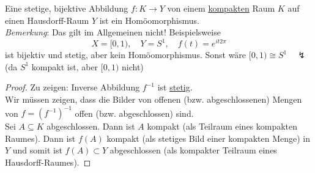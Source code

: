 \begin{theorem}
  Eine stetige, bijektive Abbildung $ f : K \to Y $ von einem \hyperref[def:kompakt]{kompakten} Raum $ K $ auf einen Hausdorff-Raum $ Y $ ist ein Homöomorphismus. \\
  \emph{Bemerkung}: Das gilt im Allgemeinen nicht! Beispielsweise
  \begin{equation*}
    X = [0,1), \quad Y = S^1, \quad f(t) = e^{it2\pi}
  \end{equation*}
  ist bijektiv und stetig, aber kein Homöomorphismus. Sonst wäre $ [0,1) \cong S^1 \quad \lightning $ (da $ S^1 $ kompakt ist, aber $ [0,1) $ nicht)
  \begin{proof}
    Zu zeigen: Inverse Abbildung $ f^{-1} $ ist \hyperref[def:stetig]{stetig}. \\
    Wir müssen zeigen, dass die Bilder von offenen (bzw. abgeschlossenen) Mengen von $ f = \left( f^{-1} \right)^{-1} $ offen (bzw. abgeschlossen) sind. \\
    Sei $ A \subseteq K $ abgeschlossen. Dann ist $ A $ kompakt (als Teilraum eines kompakten Raumes). Dann ist $ f(A) $ kompakt (als stetiges Bild einer kompakten Menge) in $ Y $ und somit ist $ f(A) \subset Y $ abgeschlossen (als kompakter Teilraum eines Hausdorff-Raumes).
  \end{proof}
\end{theorem}
